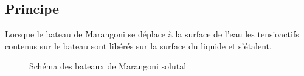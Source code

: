 \documentclass[french, 10pt]{article}
\begin{document}
% 
% 
% 
\subsection{Principe}



Lorsque le bateau de Marangoni se déplace à la surface de l'eau les tensioactifs contenus sur le bateau sont libérés sur la surface du liquide et s'étalent. 

\begin{figure}
  \centering
  \resizebox{.5\textwidth}{!}{}
  \caption{Schéma des bateaux de Marangoni solutal}
  \label{fig:sketchsoapboat}
\end{figure}
\end{document}
